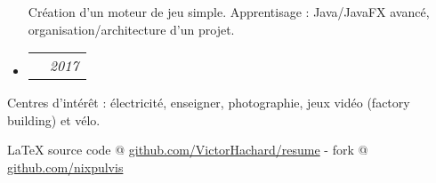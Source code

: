 \documentclass[10pt,a4paper]{article}
\makeatletter
\newcommand{\latex}{\LaTeX\xspace}
\newenvironment{indentsection}[1]
{\begin{list}{}
  {\setlength{\leftmargin}{#1}} \item[]
}
{\end{list}}
\newcommand{\headerrow}[2]
{\begin{tabular*}{\linewidth}{l@{\extracolsep{\fill}}r}
  #1 &
  #2 \\
\end{tabular*}}
\makeatother
\begin{document}
\begin{itemize}
\begin{itemize*}
        Création d'un moteur de jeu simple. Apprentisage : Java/JavaFX avancé,
        organisation/architecture d'un projet.
      \end{itemize*}
    \item
    \headerrow
      {\textbf{ \href[pdfnewwindow=true]{https://victorhachard.github.io/projects/boby-is-you}
        {Boby Is You}} -- Travail scolaire réalisé}
      {\emph{2017}}
  \end{itemize}


\begin{indentsection}{\parindent}
\begin{description*}
\item[Centres d'intérêt :]
  électricité, enseigner, photographie, jeux vidéo (factory building) et vélo.
\end{description*}
\end{indentsection}


\begin{center}
\footnotesize \latex source code @
\href{http://www.github.com/VictorHachard/resume}
{github.com/VictorHachard/resume} - fork @
\href{http://www.github.com/nixpulvis}
{github.com/nixpulvis} \\
\end{center}
\end{document}
